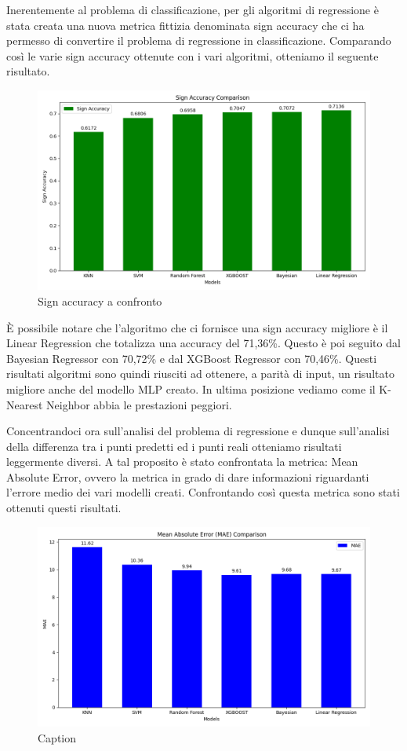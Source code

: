 \documentclass[a4paper]{article}
\numberwithin{equation}{section}
\begin{document}
Inerentemente al problema di classificazione, per gli algoritmi di regressione è stata creata una nuova metrica fittizia denominata sign accuracy che ci ha permesso di convertire il problema di regressione in classificazione.
Comparando così le varie sign accuracy ottenute con i vari algoritmi, otteniamo il seguente risultato.
\begin{figure}[H]
    \centering
    \includegraphics[width=0.7\linewidth]{img/sign_accuracy.png}
    \caption{Sign accuracy a confronto}
    \label{fig:enter-label}
\end{figure}

È possibile notare che l'algoritmo che ci fornisce una sign accuracy migliore è il Linear Regression che totalizza una accuracy del 71,36\%. Questo è poi seguito dal Bayesian Regressor con 70,72\% e dal XGBoost Regressor con 70,46\%.
Questi risultati algoritmi sono quindi riusciti ad ottenere, a parità di input, un risultato migliore anche del modello MLP creato.
In ultima posizione vediamo come il K-Nearest Neighbor abbia le prestazioni peggiori. 
\newline

Concentrandoci ora sull'analisi del problema di regressione e dunque sull'analisi della differenza tra i punti predetti ed i punti reali otteniamo risultati leggermente diversi.
A tal proposito è stato confrontata la metrica: Mean Absolute Error, ovvero la metrica in grado di dare informazioni riguardanti l'errore medio dei vari modelli creati.
Confrontando così questa metrica sono stati ottenuti questi risultati.
\begin{figure}[H]
    \centering
    \includegraphics[width=0.7\linewidth]{img/mae_a_confronto.png}
    \caption{Caption}
    \label{fig:enter-label}
\end{figure}
\end{document}
